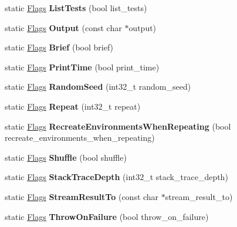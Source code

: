\begin{DoxyCompactItemize}
static \mbox{\hyperlink{structtesting_1_1Flags}{Flags}} {\bfseries List\+Tests} (bool list\+\_\+tests)
\item 
\mbox{\label{structtesting_1_1Flags_a507916734a6d7ff2dd02891d7849f2d3}} 
static \mbox{\hyperlink{structtesting_1_1Flags}{Flags}} {\bfseries Output} (const char $\ast$output)
\item 
\mbox{\label{structtesting_1_1Flags_a367d58aed5d9b8959b648d758449e82c}} 
static \mbox{\hyperlink{structtesting_1_1Flags}{Flags}} {\bfseries Brief} (bool brief)
\item 
\mbox{\label{structtesting_1_1Flags_af4dc8454995fb3691399a049e95de179}} 
static \mbox{\hyperlink{structtesting_1_1Flags}{Flags}} {\bfseries Print\+Time} (bool print\+\_\+time)
\item 
\mbox{\label{structtesting_1_1Flags_a2d4880f05d0c9bd6acd4c67ebe87f9e0}} 
static \mbox{\hyperlink{structtesting_1_1Flags}{Flags}} {\bfseries Random\+Seed} (int32\+\_\+t random\+\_\+seed)
\item 
\mbox{\label{structtesting_1_1Flags_a56255ab957ff2fb03f6c3e9f4e3d56f1}} 
static \mbox{\hyperlink{structtesting_1_1Flags}{Flags}} {\bfseries Repeat} (int32\+\_\+t repeat)
\item 
\mbox{\label{structtesting_1_1Flags_a74454406b978f0e9e8bf57b7a18af25a}} 
static \mbox{\hyperlink{structtesting_1_1Flags}{Flags}} {\bfseries Recreate\+Environments\+When\+Repeating} (bool recreate\+\_\+environments\+\_\+when\+\_\+repeating)
\item 
\mbox{\label{structtesting_1_1Flags_a19ddbbaed61bda44a1940333b7c5a469}} 
static \mbox{\hyperlink{structtesting_1_1Flags}{Flags}} {\bfseries Shuffle} (bool shuffle)
\item 
\mbox{\label{structtesting_1_1Flags_aafbd8a4b7d59f7780d10c15aa0fdf456}} 
static \mbox{\hyperlink{structtesting_1_1Flags}{Flags}} {\bfseries Stack\+Trace\+Depth} (int32\+\_\+t stack\+\_\+trace\+\_\+depth)
\item 
\mbox{\label{structtesting_1_1Flags_a9cf0f64310b28eadbbfbb35584ebfc71}} 
static \mbox{\hyperlink{structtesting_1_1Flags}{Flags}} {\bfseries Stream\+Result\+To} (const char $\ast$stream\+\_\+result\+\_\+to)
\item 
\mbox{\label{structtesting_1_1Flags_ad856df862414ed0dadf80b5e03829cc7}} 
static \mbox{\hyperlink{structtesting_1_1Flags}{Flags}} {\bfseries Throw\+On\+Failure} (bool throw\+\_\+on\+\_\+failure)
\end{DoxyCompactItemize}
